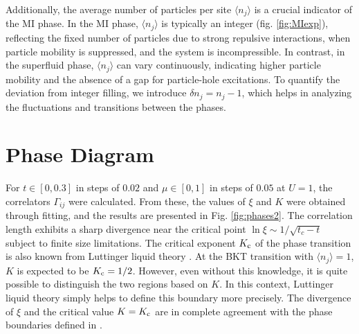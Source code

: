 Additionally, the average number of particles per site $\langle n_j \rangle$ is a crucial indicator of the MI phase. In the MI phase, $\langle n_j \rangle$ is typically an integer (fig. \ref{fig:MIexp}), reflecting the fixed number of particles due to strong repulsive interactions, when particle mobility is suppressed, and the system is incompressible. In contrast, in the superfluid phase, $\langle n_j \rangle$ can vary continuously, indicating higher particle mobility and the absence of a gap for particle-hole excitations. To quantify the deviation from integer filling, we introduce $\delta n_j = n_j - 1$, which helps in analyzing the fluctuations and transitions between the phases.




\section{Phase Diagram}

For $t \in[0, 0.3]$ in steps of $0.02$ and $\mu \in [0, 1]$ in steps of $0.05$ at $U=1$, the correlators $\Gamma_{ij}$ were calculated. From these, the values of $\xi$ and $K$ were obtained through fitting, and the results are presented in Fig. \ref{fig:phases2}. The correlation length exhibits a sharp divergence near the critical point $\ln \xi \sim 1 / \sqrt{t_c - t}$ 
subject to finite size limitations. The critical exponent $K_{\textnormal{c}}$ of the phase transition is also known from Luttinger liquid theory \cite{PhysRevB.46.9325,kuehner_phases_1998}. At the BKT transition with $\langle n_j \rangle = 1$, $K$ is expected to be $K_{\textnormal{c}} = 1/2$. However, even without this knowledge, it is quite possible to distinguish the two regions based on $K$. In this context, Luttinger liquid theory simply helps to define this boundary more precisely. The divergence of $\xi$ and the critical value $K = K_{\textnormal{c}}$ are in complete agreement with the phase boundaries defined in \cite{kuehner_phases_1998}.


